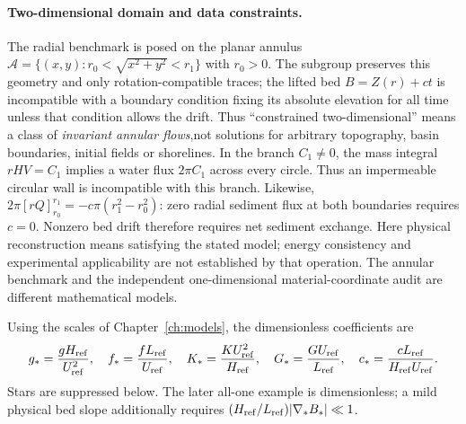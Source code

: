 \documentclass[12pt,a4paper,oneside]{report}
\numberwithin{equation}{chapter}
\theoremstyle{remark}\newtheorem{remark}[theorem]{Remark}
\begin{document}
\paragraph{Two-dimensional domain and data constraints.}
The radial benchmark is posed on the planar annulus
$\mathcal A=\{(x,y):r_0<\sqrt{x^2+y^2}<r_1\}$ with $r_0>0$.
The subgroup preserves this geometry and only rotation-compatible traces;
the lifted bed $B=Z(r)+ct$ is incompatible with a boundary condition fixing
its absolute elevation for all time unless that condition allows the drift.
Thus ``constrained two-dimensional'' means a class of \emph{invariant
annular flows},\linebreak not solutions for arbitrary topography, basin boundaries,
initial fields or shorelines. In the branch $C_1\ne0$, the mass integral
$rHV=C_1$ implies a water flux $2\pi C_1$ across every circle. Thus an
impermeable circular wall is incompatible with this branch. Likewise,
$2\pi[rQ]_{r_0}^{r_1}=-c\pi(r_1^2-r_0^2)$: zero radial sediment flux at
both boundaries requires $c=0$. Nonzero bed drift therefore requires net
sediment exchange. Here physical reconstruction means satisfying the stated
model; energy consistency and experimental applicability are not established
by that operation. The annular benchmark and the independent
one-dimensional material-coordinate audit are different mathematical models.


Using the scales of Chapter~\ref{ch:models}, the dimensionless coefficients are
\begin{equation}\label{eq:2d-scales}
 g_*=\frac{gH_{\rm ref}}{U_{\rm ref}^2},\quad f_*=\frac{fL_{\rm ref}}{U_{\rm ref}},\quad
 K_*=\frac{KU_{\rm ref}^2}{H_{\rm ref}},\quad G_*=\frac{GU_{\rm ref}}{L_{\rm ref}},\quad
 c_*=\frac{cL_{\rm ref}}{H_{\rm ref}U_{\rm ref}}.
\end{equation}
Stars are suppressed below. The later all-one example is dimensionless;
a mild physical bed slope additionally requires
$(H_{\rm ref}/L_{\rm ref})|\nabla_*B_*|\ll1$.
\end{document}
